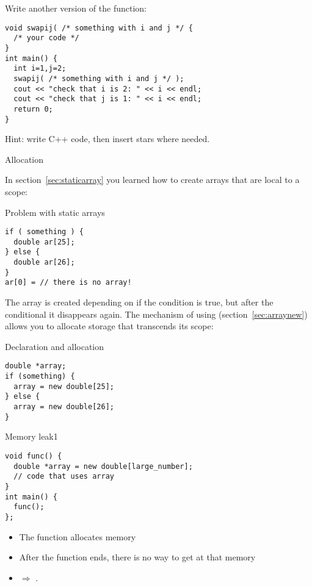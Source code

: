 \begin{exercise}
  \label{ex:c-star-swap}
  Write another version of the  function:
\begin{verbatim}
void swapij( /* something with i and j */ {
  /* your code */
}
int main() {
  int i=1,j=2;
  swapij( /* something with i and j */ );
  cout << "check that i is 2: " << i << endl;
  cout << "check that j is 1: " << i << endl;
  return 0;
}
\end{verbatim}
Hint: write C++ code, then insert stars where needed.
\end{exercise}

 {Allocation}

In section~\ref{sec:staticarray} you learned how to create arrays that
are local to a scope:

\begin{block}{Problem with static arrays}
  \label{sl:no-static-alloc}
\begin{verbatim}
if ( something ) {
  double ar[25];
} else {
  double ar[26];
}
ar[0] = // there is no array!
\end{verbatim}
\end{block}

The array  is created depending on if the condition is true, but
after
the conditional it disappears again. The mechanism of using
 (section~\ref{sec:arraynew}) allows you to allocate
storage that transcends its scope:

\begin{block}{Declaration and allocation}
  \label{sl:c-array-new}
\begin{verbatim}
double *array;
if (something) {
  array = new double[25];
} else {
  array = new double[26];
}
\end{verbatim}
\end{block}

\begin{block}{Memory leak1}
  \label{sl:leak1}
\begin{verbatim}
void func() {
  double *array = new double[large_number];
  // code that uses array
}
int main() {
  func();
};
\end{verbatim}
\begin{itemize}
\item
  The function allocates memory
\item After the function ends, there is no way to get at that memory
\item $\Rightarrow$ .
\end{itemize}

\end{block}


